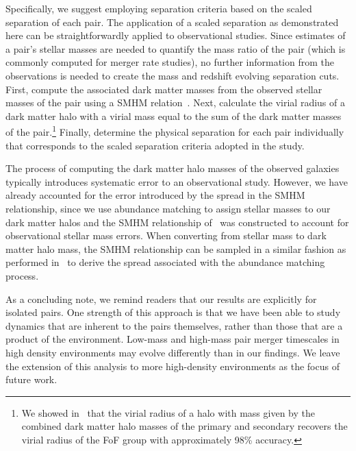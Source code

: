 \documentclass[twocolumn,linenumbers]{aastex631}
\newcommand{\chambe}{\citet{Chamberlain2024}}
\begin{document}
            Specifically, we suggest employing separation criteria based on the scaled separation of each pair. 
            The application of a scaled separation as demonstrated here can be straightforwardly applied to observational studies. 
            Since estimates of a pair's stellar masses are needed to quantify the mass ratio of the pair (which is commonly computed for merger rate studies), no further information from the observations is needed to create the mass and redshift evolving separation cuts. 
            First, compute the associated dark matter masses from the observed stellar masses of the pair using a SMHM relation~\citep[in this study, we employ that of][]{Moster2013}.
            Next, calculate the virial radius of a dark matter halo with a virial mass equal to the sum of the dark matter masses of the pair.\footnote{We showed in~\chambe{} that the virial radius of a halo with mass given by the combined dark matter halo masses of the primary and secondary recovers the virial radius of the FoF group with approximately 98\% accuracy.}
            Finally, determine the physical separation for each pair individually that corresponds to the scaled separation criteria adopted in the study.

            The process of computing the dark matter halo masses of the observed galaxies typically introduces systematic error to an observational study.
            However, we have already accounted for the error introduced by the spread in the SMHM relationship, since we use abundance matching to assign stellar masses to our dark matter halos and the SMHM relationship of~\cite{Moster2013} was constructed to account for observational stellar mass errors.
            When converting from stellar mass to dark matter halo mass, the SMHM relationship can be sampled in a similar fashion as performed in~\chambe{} to derive the spread associated with the abundance matching process.
            
            As a concluding note, we remind readers that our results are explicitly for isolated pairs. 
            One strength of this approach is that we have been able to study dynamics that are inherent to the pairs themselves, rather than those that are a product of the environment. 
            Low-mass and high-mass pair merger timescales in high density environments may evolve differently than in our findings. 
            We leave the extension of this analysis to more high-density environments as the focus of future work. 
   
\end{document}
